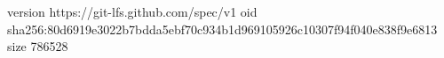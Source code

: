 version https://git-lfs.github.com/spec/v1
oid sha256:80d6919e3022b7bdda5ebf70c934b1d969105926c10307f94f040e838f9e6813
size 786528
